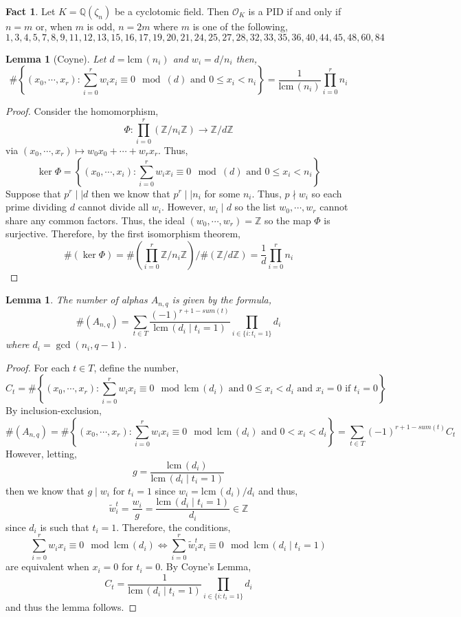 \documentclass{article}
\newcommand{\Z}{\mathbb{Z}}
\newcommand{\Q}{\mathbb{Q}}
\newcommand{\iO}{\mathcal{O}}
\newcommand{\divides}{\mid}
\newcommand{\lcm}[0]{\mathrm{lcm} \,}
\newtheorem{lemma}[theorem]{Lemma}
\theoremstyle{definition}
\theoremstyle{definition}
\newtheorem{fact}[theorem]{Fact}
\theoremstyle{remark}
\begin{document}
\begin{fact}
Let $K = \Q(\zeta_n)$ be a cyclotomic field. Then $\iO_{K}$ is a PID if and only if $n = m$ or, when $m$ is odd, $n = 2m$ where $m$ is one of the following,
\[ 1, 3, 4, 5, 7, 8, 9, 11, 12, 13, 15, 16, 17, 19, 20, 21, 24, 25, 27, 28, 32, 33, 35, 36, 40, 44, 45, 48, 60, 84 \]
\end{fact}

\begin{lemma}[Coyne]
Let $d = \lcm{(n_i)}$ and $w_i = d/n_i$ then,
\[ \# \left\{ (x_0, \cdots, x_r) : \sum_{i = 0}^{r} w_i x_i \equiv 0 \mod{(d)} \text{ and } 0 \le x_i < n_i  \right\} = \frac{1}{\lcm{(n_i)}} \prod\limits_{i = 0}^r n_i  \] 
\end{lemma}

\begin{proof}
Consider the homomorphism,
\[ \Phi : \prod_{i = 0}^r (\Z / n_i \Z) \to \Z / d \Z \]
via $(x_0, \cdots, x_r) \mapsto w_0 x_0 + \cdots + w_r x_r$. Thus,
\[ \ker{\Phi} = \left\{ (x_0, \cdots, x_i) : \sum_{i = 0}^{r} w_i x_i \equiv 0 \mod{(d)} \text{ and } 0 \le x_i < n_i  \right\} \]
Suppose that $p^r \divides \divides d$ then we know that $p^r \divides \divides n_i$ for some $n_i$. Thus, $p \nmid w_i$ so each prime dividing $d$ cannot divide all $w_i$. However, $w_i \divides d$ so the list $w_0, \cdots, w_r$ cannot share any common factors. Thus, the ideal $(w_0, \cdots, w_r) = \Z$ so the map $\Phi$ is surjective. Therefore, by the first isomorphism theorem,
\[ \#(\ker{\Phi}) = \#\left( \prod_{i = 0}^r \Z / n_i \Z \right) \bigg/ \#(\Z / d \Z) = \frac{1}{d} \prod_{i = 0}^r n_i \]
\end{proof}

\begin{lemma}
The number of alphas $A_{n,q}$ is given by the formula,
\[ \#(A_{n,q}) = \sum_{t \in T} \frac{(-1)^{r + 1 - sum(t)}}{\lcm{(d_i \mid t_i = 1)}} \prod_{i \in \{ i :  t_i = 1 \} } d_i \] 
where $d_i = \gcd{(n_i, q - 1)}$. 
\end{lemma}

\begin{proof}
For each $t \in T$, define the number,
\[ C_t = \# \left\{ (x_0, \cdots, x_r) : \sum_{i = 0}^{r} w_i x_i \equiv 0 \mod{\lcm(d_i)} \text{ and } 0 \le x_i < d_i \text{ and } x_i = 0 \text{ if } t_i = 0 \right\} \]
By inclusion-exclusion,
\[ \#(A_{n,q}) = \# \left\{ (x_0, \cdots, x_r) : \sum_{i = 0}^{r} w_i x_i \equiv 0 \mod{\lcm{(d_i)}} \text{ and } 0 < x_i < d_i \right\} = \sum_{t \in T} (-1)^{r+1 - sum(t)} C_t \]
However, letting,
\[ g = \frac{\lcm{(d_i)}}{\lcm{(d_i \mid t_i = 1)}} \]
then we know that $g \divides w_i$ for $t_i = 1$ since $w_i = \lcm{(d_i)} / d_i$ and thus,
\[ \tilde{w}^t_i = \frac{w_i}{g} = \frac{\lcm{(d_i \mid t_i = 1)}}{d_i} \in \Z \]
since $d_i$ is such that $t_i = 1$. Therefore, the conditions,
\[ \sum_{i = 0}^r w_i x_i \equiv 0 \mod \lcm{(d_i)} \iff \sum_{i = 0}^r \tilde{w}^t_i x_i \equiv 0 \mod \lcm{(d_i \mid t_i = 1)} \] 
are equivalent when $x_i = 0$ for $t_i = 0$. 
By Coyne's Lemma,
\[ C_t = \frac{1}{\lcm{(d_i \mid t_i = 1 )}} \prod_{i \in \{ i :  t_i = 1 \} } d_i \] 
and thus the lemma follows. 
\end{proof}
\end{document}
